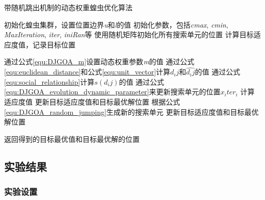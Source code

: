 \begin{algorithm}
    \caption{带随机跳出机制的动态权重蝗虫优化算法}
    \label{alg:DJGOA}
    
    \begin{algorithmic}[1]
    
    \State 初始化蝗虫集群，设置位置边界\emph{u}和\emph{l}的值
    \State 初始化参数，包括\emph{cmax}, \emph{cmin}, \emph{MaxIteration}, \emph{iter}, \emph{iniRan}等
    \State 使用随机矩阵初始化所有搜索单元的位置
    \State 计算目标适应度值，记录目标位置
    
    \State 通过公式\ref{equ:DJGOA_m}设置动态权重参数\emph{m}的值
    \State 通过公式\ref{equ:euclidean_distance}和公式\ref{equ:unit_vector}计算$d_ij$和$\widehat{d_ij}$的值
    \State 通过公式\ref{equ:social_relationship}计算$s(d_ij)$的值
    \State 通过公式\ref{equ:DJGOA_evolution_dynamic_parameter}来更新搜索单元的位置$x_iter_i$
    \State 计算适应度值 
        \State 更新目标适应度值和目标最优解位置
    \EndIf
        \State 根据公式\ref{equ:DJGOA_random_jumping}生成新的搜索单元
            \State 更新目标适应度值和目标最优解位置
        \EndIf
    \EndIf
     
    \EndWhile

    \State 返回得到的目标最优值和目标最优解的位置
    
    
    \end{algorithmic}
    
\end{algorithm}

\subsection{实验结果}
\subsubsection{实验设置}

